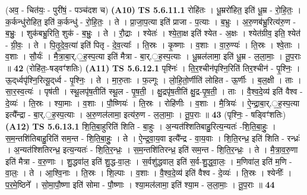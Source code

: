 \documentclass[17pt]{extarticle}
\begin{document}
                  \newline
                      (अव॒ - चित॑यः॒ - पुरी॑षं॒ - पञ्च॑दश च)  \textbf{(A10)} \newline \newline
                                \textbf{ TS 5.6.11.1} \newline
                  रोहि॑तः । धू॒म्ररो॑हित॒ इति॑ धू॒म्र - रो॒हि॒तः॒ । क॒र्कन्धु॑रोहित॒ इति॑ क॒र्कन्धु॑ - रो॒हि॒तः॒ । ते । प्रा॒जा॒प॒त्या इति॑ प्राजा - प॒त्याः । ब॒भ्रुः । अ॒रु॒णब॑भ्रु॒रित्य॑रु॒ण - ब॒भ्रुः॒ । शुक॑बभ्रु॒रिति॒ शुक॑ - ब॒भ्रुः॒ । ते । रौ॒द्राः । श्येतः॑ । श्ये॒ता॒क्ष इति॑ श्येत - अ॒क्षः । श्येत॑ग्रीव॒ इति॒ श्येत॑ - ग्री॒वः॒ । ते । पि॒तृ॒दे॒व॒त्या॑ इति॑ पितृ - दे॒व॒त्याः᳚ । ति॒स्रः । कृ॒ष्णाः । व॒शाः । वा॒रु॒ण्यः॑ । ति॒स्रः । श्वे॒ताः । व॒शाः । सौ॒र्यः॑ । मै॒त्रा॒बा॒र्.॒ह॒स्प॒त्या इति॑ मैत्रा - बा॒र्.॒ह॒स्प॒त्याः । धू॒म्रल॑लामा॒ इति॑ धू॒म्र - ल॒ला॒माः॒ । तू॒प॒राः ॥ \textbf{  42 } \newline
                  \newline
                      (रोहि॑तः॒-षड्वꣳ॑शतिः)  \textbf{(A11)} \newline \newline
                                \textbf{ TS 5.6.12.1} \newline
                  पृश्निः॑ । ति॒र॒श्चीन॑पृश्नि॒रिति॑ तिर॒श्चीन॑ - पृ॒श्निः॒ । ऊ॒द्‌र्ध्वपृ॑श्नि॒रित्यू॒द्‌र्ध्व - पृ॒श्निः॒ । ते । मा॒रु॒ताः । फ॒ल्गूः । लो॒हि॒तो॒र्णीति॑ लोहित - ऊ॒र्णीः । ब॒ल॒क्षी । ताः । सा॒र॒स्व॒त्यः॑ । पृष॑ती । स्थू॒लपृ॑ष॒तीति॑ स्थू॒ल - पृ॒ष॒ती॒ । क्षु॒द्रपृ॑ष॒तीति॑ क्षु॒द्र-पृ॒ष॒ती॒ । ताः । वै॒श्व॒दे॒व्य॑ इति॑ वैश्व - दे॒व्यः॑ । ति॒स्रः । श्या॒माः । व॒शाः । पौ॒ष्णियः॑ । ति॒स्रः । रोहि॑णीः । व॒शाः । मै॒त्रियः॑ । ऐ॒न्द्रा॒बा॒र्.॒ह॒स्प॒त्या इत्यै᳚न्द्रा - बा॒र्.॒ह॒स्प॒त्याः । अ॒रु॒णल॑लामा॒ इत्य॑रु॒ण - ल॒ला॒माः॒ । तू॒प॒राः ॥ \textbf{  43 } \newline
                  \newline
                      (पृश्निः॒ - षड्विꣳ॑शतिः)  \textbf{(A12)} \newline \newline
                                \textbf{ TS 5.6.13.1} \newline
                  शि॒ति॒बा॒हुरिति॑ शिति - बा॒हुः । अ॒न्यत॑श्शितिबाहु॒रित्य॒न्यतः॑ -शि॒ति॒बा॒हुः॒ । स॒म॒न्तशि॑तिबाहु॒रिति॑ सम॒न्त - शि॒ति॒बा॒हुः॒ । ते । ऐ॒न्द्र॒वा॒य॒वा इत्यै᳚न्द्र - वा॒य॒वाः । शि॒ति॒रन्ध्र॒ इति॑ शिति - रन्ध्रः॑ । अ॒न्यत॑श्शितिरन्ध्र॒ इत्य॒न्यतः॑ - शि॒ति॒र॒न्ध्रः॒ । स॒म॒न्तशि॑तिरन्ध्र॒ इति॑ सम॒न्त - शि॒ति॒र॒न्ध्रः॒ । ते । मै॒त्रा॒व॒रु॒णा इति॑ मैत्रा - व॒रु॒णाः । शु॒द्धवा॑ल॒ इति॑ शु॒द्ध-वा॒लः॒ । स॒र्वशु॑द्धवाल॒ इति॑ स॒र्व-शु॒द्ध॒वा॒लः॒ । म॒णिवा॑ल॒ इति॑ म॒णि - वा॒लः॒ । ते । आ॒श्वि॒नाः । ति॒स्रः । शि॒ल्पाः । व॒शाः । वै॒श्व॒दे॒व्य॑ इति॑ वैश्व - दे॒व्यः॑ । ति॒स्रः । श्येनीः᳚ । प॒र॒मे॒ष्ठिने᳚ । सो॒मा॒पौ॒ष्णा इति॑ सोमा - पौ॒ष्णाः । श्या॒मल॑लामा॒ इति॑ श्या॒म - ल॒ला॒माः॒ । तू॒प॒राः ॥ \textbf{  44 } \newline
\end{document}
